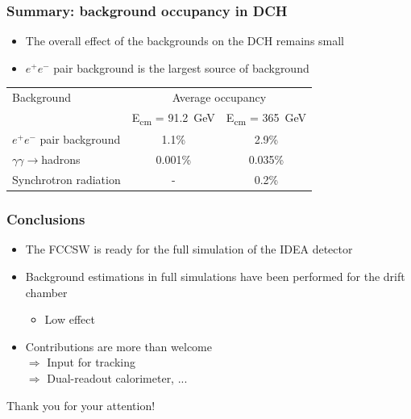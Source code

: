 \documentclass[hyperref={colorlinks=true,pdfpagelabels=false,linkcolor=black}, xcolor=dvipsnames,10pt]{beamer}
\begin{document}
\begin{frame}
	\frametitle{Summary: background occupancy in DCH}

  \begin{itemize}
    \item The overall effect of the backgrounds on the DCH remains small
    \item $e^+e^-$ pair background is the largest source of background
  \end{itemize}

  \vspace{0.5cm}

  \centering
  \begin{tabular}{l c c}
    \toprule
    Background & \multicolumn{2}{c}{Average occupancy} \\
     & E\textsubscript{cm} = 91.2~GeV &  E\textsubscript{cm} = 365~GeV \\
    \midrule
    $e^+e^-$ pair background & 1.1\% & 2.9\% \\
    $\gamma\gamma\rightarrow$hadrons & 0.001\% & 0.035\%  \\
    Synchrotron radiation & - & 0.2\% \\
    \bottomrule
  \end{tabular}
\end{frame}

\label{lastslide}
\begin{frame}
	\frametitle{Conclusions}

  \begin{itemize}
    \item The FCCSW is ready for the full simulation of the IDEA detector \vspace{0.5cm}
    \item Background estimations in full simulations have been performed for the drift chamber
    \begin{itemize}
      \item Low effect
    \end{itemize} \vspace{0.5cm}
    \item Contributions are more than welcome \\
    $\Rightarrow$ Input for tracking \\
    $\Rightarrow$ Dual-readout calorimeter, ...
  \end{itemize}

  \vspace{1cm}
  \Huge{Thank you for your attention!}
\end{frame}


\end{document}
